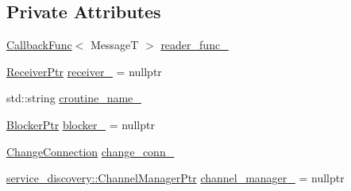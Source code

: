 \subsection*{Private Attributes}
\begin{DoxyCompactItemize}
\item 
\hyperlink{namespaceapollo_1_1cyber_ac2b119de9ef52dbfcee3b6e8d497adc4}{Callback\-Func}$<$ Message\-T $>$ \hyperlink{classapollo_1_1cyber_1_1Reader_afdcdb17f7d7931c63296cb16d25c57c1}{reader\-\_\-func\-\_\-}
\item 
\hyperlink{classapollo_1_1cyber_1_1Reader_a7c76533ce5c8e13f5382248ae2059aad}{Receiver\-Ptr} \hyperlink{classapollo_1_1cyber_1_1Reader_a5524305568327b0bbe875ef3d1a7ba70}{receiver\-\_\-} = nullptr
\item 
std\-::string \hyperlink{classapollo_1_1cyber_1_1Reader_a5320ff9e45bf868262d9bd652c7294d3}{croutine\-\_\-name\-\_\-}
\item 
\hyperlink{classapollo_1_1cyber_1_1Reader_a44a6c385712936a5d4eaaa1920d05013}{Blocker\-Ptr} \hyperlink{classapollo_1_1cyber_1_1Reader_a67f9c4a80820313ff8e0cf8dcc733648}{blocker\-\_\-} = nullptr
\item 
\hyperlink{classapollo_1_1cyber_1_1Reader_a1bb84e1881d6df00cd3b8fc669b606b4}{Change\-Connection} \hyperlink{classapollo_1_1cyber_1_1Reader_a2b2a5f2abea3a8c6c82b926f6ac5f5ff}{change\-\_\-conn\-\_\-}
\item 
\hyperlink{namespaceapollo_1_1cyber_1_1service__discovery_a12c2dfc39551ef96e3110dae235ab609}{service\-\_\-discovery\-::\-Channel\-Manager\-Ptr} \hyperlink{classapollo_1_1cyber_1_1Reader_a5a7475f8ed5c996970a66d8c4338f8fd}{channel\-\_\-manager\-\_\-} = nullptr
\end{DoxyCompactItemize}


